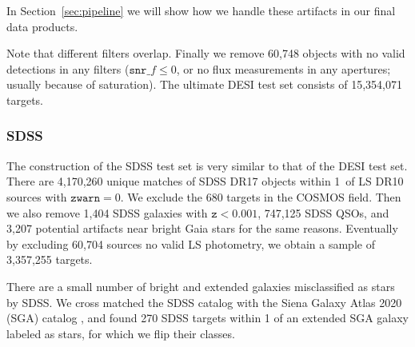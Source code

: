 \documentclass[twocolumn]{aastex631}
\newcommand{\dr}[1]{DR{#1}}
\begin{document}
\begin{CJK*}{UTF8}{gbsn}
\begin{itemize}
    In Section~\ref{sec:pipeline} we will show how we handle these artifacts in our final data products.
\end{itemize}
Note that different filters overlap. Finally we remove 60,748 objects with no valid detections in any filters ($\texttt{snr\_}f \le 0$, or no flux measurements in any apertures; usually because of saturation). The ultimate DESI test set consists of 15,354,071 targets.

\subsubsection{SDSS}\label{sec:SDSS}
The construction of the SDSS test set is very similar to that of the DESI test set. There are 4,170,260 unique matches of SDSS \dr{17} objects within 1\arcsec\ of LS \dr{10} sources with $\texttt{zwarn}=0$. We exclude the 680 targets in the COSMOS field. Then we also remove 1,404 SDSS galaxies with $\texttt{z}<0.001$, 747,125 SDSS QSOs, and 3,207 potential artifacts near bright Gaia stars for the same reasons. Eventually by excluding 60,704 sources no valid LS photometry, we obtain a sample of 3,357,255 targets.

There are a small number of bright and extended galaxies misclassified as stars by SDSS. We cross matched the SDSS catalog with the Siena Galaxy Atlas 2020 (SGA) catalog \citep{SGA_2023}, and found 270 SDSS targets within 1 of an extended SGA galaxy labeled as stars, for which we flip their classes.


\end{CJK*}
\end{document}
